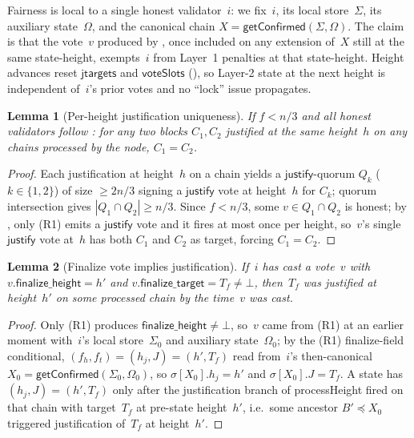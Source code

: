 \ifx\litemode\undefined\documentclass{article}\fi
\newcommand{\just}{\ensuremath{\mathsf{justify}}\xspace}
\newcommand{\finalizeHeight}{\mathsf{finalize\_height}}
\newcommand{\finalizeTarget}{\mathsf{finalize\_target}}
\newcommand{\jtargets}{\mathsf{jtargets}}
\newcommand{\voteSlots}{\mathsf{voteSlots}}
\newcommand{\processHeight}{\textsf{processHeight}\xspace}
\newcommand{\getConfirmed}{\textsf{getConfirmed}\xspace}
\theoremstyle{plain}
\newtheorem{lemma}{Lemma}
\theoremstyle{definition}
\theoremstyle{remark}
\begin{document}
Fairness is local to a single honest validator~$i$: we fix~$i$, its local store~$\Sigma$, its auxiliary state~$\Omega$, and the canonical chain $X = \getConfirmed(\Sigma, \Omega)$.
The claim is that the vote~$v$ produced by , once included on any extension of~$X$ still at the same state-height, exempts~$i$ from Layer~1 penalties at that state-height.
Height advances reset $\jtargets$ and $\voteSlots$ (), so Layer-2 state at the next height is independent of~$i$'s prior votes and no ``lock'' issue propagates.

\begin{lemma}[Per-height justification uniqueness]\label{lem:just-unique-height}
If $f < n/3$ and all honest validators follow : for any two blocks $C_1, C_2$ justified at the same height~$h$ on any chains processed by the node, $C_1 = C_2$.
\end{lemma}

\begin{proof}
Each justification at height~$h$ on a chain yields a \just-quorum $Q_k$ ($k \in \{1, 2\}$) of size $\geq 2n/3$ signing a \just vote at height~$h$ for $C_k$; quorum intersection gives $|Q_1 \cap Q_2| \geq n/3$.
Since $f < n/3$, some $v \in Q_1 \cap Q_2$ is honest; by , only (R1) emits a \just vote and it fires at most once per height, so~$v$'s single \just vote at~$h$ has both $C_1$ and $C_2$ as target, forcing $C_1 = C_2$.
\end{proof}

\begin{lemma}[Finalize vote implies justification]\label{lem:no-finalize-without-just}
If~$i$ has cast a vote~$v$ with $v.\finalizeHeight = h'$ and $v.\finalizeTarget = T_f \neq \bot$, then~$T_f$ was justified at height~$h'$ on some processed chain by the time~$v$ was cast.
\end{lemma}

\begin{proof}
Only (R1) produces $\finalizeHeight \neq \bot$, so~$v$ came from (R1) at an earlier moment with~$i$'s local store~$\Sigma_0$ and auxiliary state~$\Omega_0$; by the (R1) finalize-field conditional, $(f_h, f_t) = (h_j, J) = (h', T_f)$ read from~$i$'s then-canonical $X_0 = \getConfirmed(\Sigma_0, \Omega_0)$, so $\sigma[X_0].h_j = h'$ and $\sigma[X_0].J = T_f$.
A state has $(h_j, J) = (h', T_f)$ only after the justification branch of \processHeight fired on that chain with target~$T_f$ at pre-state height~$h'$, i.e.\ some ancestor $B' \preceq X_0$ triggered justification of~$T_f$ at height~$h'$.
\end{proof}
\end{document}
